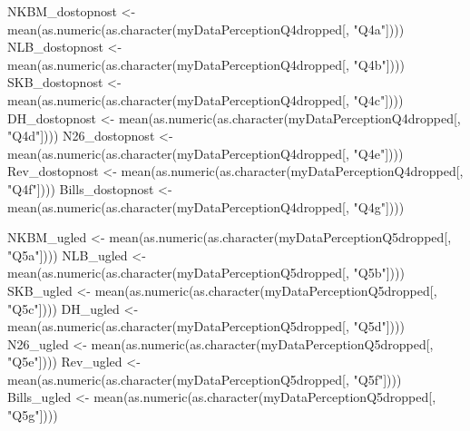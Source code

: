 \documentclass[
]{article}
\newenvironment{Shaded}{\begin{snugshade}}{\end{snugshade}}
\newcommand{\FunctionTok}[1]{\textcolor[rgb]{0.00,0.00,0.00}{#1}}
\newcommand{\NormalTok}[1]{#1}
\newcommand{\OtherTok}[1]{\textcolor[rgb]{0.56,0.35,0.01}{#1}}
\newcommand{\StringTok}[1]{\textcolor[rgb]{0.31,0.60,0.02}{#1}}
\begin{document}
\begin{Shaded}
\begin{Highlighting}[]
\NormalTok{NKBM\_dostopnost }\OtherTok{\textless{}{-}} \FunctionTok{mean}\NormalTok{(}\FunctionTok{as.numeric}\NormalTok{(}\FunctionTok{as.character}\NormalTok{(myDataPerceptionQ4dropped[, }\StringTok{"Q4a"}\NormalTok{])))}
\NormalTok{NLB\_dostopnost }\OtherTok{\textless{}{-}} \FunctionTok{mean}\NormalTok{(}\FunctionTok{as.numeric}\NormalTok{(}\FunctionTok{as.character}\NormalTok{(myDataPerceptionQ4dropped[, }\StringTok{"Q4b"}\NormalTok{])))}
\NormalTok{SKB\_dostopnost }\OtherTok{\textless{}{-}} \FunctionTok{mean}\NormalTok{(}\FunctionTok{as.numeric}\NormalTok{(}\FunctionTok{as.character}\NormalTok{(myDataPerceptionQ4dropped[, }\StringTok{"Q4c"}\NormalTok{])))}
\NormalTok{DH\_dostopnost }\OtherTok{\textless{}{-}} \FunctionTok{mean}\NormalTok{(}\FunctionTok{as.numeric}\NormalTok{(}\FunctionTok{as.character}\NormalTok{(myDataPerceptionQ4dropped[, }\StringTok{"Q4d"}\NormalTok{])))}
\NormalTok{N26\_dostopnost }\OtherTok{\textless{}{-}} \FunctionTok{mean}\NormalTok{(}\FunctionTok{as.numeric}\NormalTok{(}\FunctionTok{as.character}\NormalTok{(myDataPerceptionQ4dropped[, }\StringTok{"Q4e"}\NormalTok{])))}
\NormalTok{Rev\_dostopnost }\OtherTok{\textless{}{-}} \FunctionTok{mean}\NormalTok{(}\FunctionTok{as.numeric}\NormalTok{(}\FunctionTok{as.character}\NormalTok{(myDataPerceptionQ4dropped[, }\StringTok{"Q4f"}\NormalTok{])))}
\NormalTok{Bills\_dostopnost }\OtherTok{\textless{}{-}} \FunctionTok{mean}\NormalTok{(}\FunctionTok{as.numeric}\NormalTok{(}\FunctionTok{as.character}\NormalTok{(myDataPerceptionQ4dropped[, }\StringTok{"Q4g"}\NormalTok{])))}

\NormalTok{NKBM\_ugled }\OtherTok{\textless{}{-}} \FunctionTok{mean}\NormalTok{(}\FunctionTok{as.numeric}\NormalTok{(}\FunctionTok{as.character}\NormalTok{(myDataPerceptionQ5dropped[, }\StringTok{"Q5a"}\NormalTok{])))}
\NormalTok{NLB\_ugled }\OtherTok{\textless{}{-}} \FunctionTok{mean}\NormalTok{(}\FunctionTok{as.numeric}\NormalTok{(}\FunctionTok{as.character}\NormalTok{(myDataPerceptionQ5dropped[, }\StringTok{"Q5b"}\NormalTok{])))}
\NormalTok{SKB\_ugled }\OtherTok{\textless{}{-}} \FunctionTok{mean}\NormalTok{(}\FunctionTok{as.numeric}\NormalTok{(}\FunctionTok{as.character}\NormalTok{(myDataPerceptionQ5dropped[, }\StringTok{"Q5c"}\NormalTok{])))}
\NormalTok{DH\_ugled }\OtherTok{\textless{}{-}} \FunctionTok{mean}\NormalTok{(}\FunctionTok{as.numeric}\NormalTok{(}\FunctionTok{as.character}\NormalTok{(myDataPerceptionQ5dropped[, }\StringTok{"Q5d"}\NormalTok{])))}
\NormalTok{N26\_ugled }\OtherTok{\textless{}{-}} \FunctionTok{mean}\NormalTok{(}\FunctionTok{as.numeric}\NormalTok{(}\FunctionTok{as.character}\NormalTok{(myDataPerceptionQ5dropped[, }\StringTok{"Q5e"}\NormalTok{])))}
\NormalTok{Rev\_ugled }\OtherTok{\textless{}{-}} \FunctionTok{mean}\NormalTok{(}\FunctionTok{as.numeric}\NormalTok{(}\FunctionTok{as.character}\NormalTok{(myDataPerceptionQ5dropped[, }\StringTok{"Q5f"}\NormalTok{])))}
\NormalTok{Bills\_ugled }\OtherTok{\textless{}{-}} \FunctionTok{mean}\NormalTok{(}\FunctionTok{as.numeric}\NormalTok{(}\FunctionTok{as.character}\NormalTok{(myDataPerceptionQ5dropped[, }\StringTok{"Q5g"}\NormalTok{])))}


\end{Highlighting}
\end{Shaded}
\end{document}
